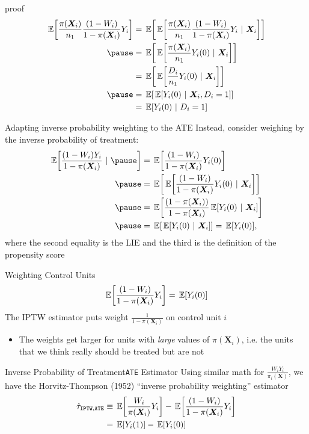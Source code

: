 \documentclass[aspectratio=169,t,11pt,table]{beamer}
\begin{document}
\begin{frame}{ proof}
  \begin{align*}
    \expec{\frac{\pi(\bm{X}_i)}{n_1} \frac{(1 - W_i)}{1 - \pi(\bm{X}_i)} Y_i}
    &= \expec{ \expec{ \frac{\pi(\bm{X}_i)}{n_1} \frac{(1 - W_i)}{1 - \pi(\bm{X}_i)} Y_i }{\bm{X}_i} } \\ \pause
    &= \expec{ \expec{\frac{\pi(\bm{X}_i)}{n_1} Y_i(0)}{\bm{X}_i} } \\
    &= \expec{ \expec{\frac{D_i}{n_1} Y_i(0)}{\bm{X}_i} } \\ \pause
    &= \expec{ \expec{Y_i(0)}{\bm{X}_i, D_i = 1} } \\
    &= \expec{Y_i(0)}{D_i = 1}
  \end{align*}
\end{frame}

\begin{frame}{Adapting inverse probability weighting to the ATE}
  Instead, consider weighing by the inverse probability of treatment:
  \begin{align*}
    \expec{\frac{(1 - W_i) Y_i}{1 - \pi(\bm{X}_i)}} \pause 
    &= \expec{\frac{(1 - W_i)}{1 - \pi(\bm{X}_i)} Y_i(0)} \\ \pause
    &= \expec{\expec{\frac{(1 - W_i) }{1 - \pi(\bm{X}_i)} Y_i(0)}{\bm{X}_i}} \\ \pause
    &= \expec{\frac{(1 - \pi(\bm{X}_i))}{1 - \pi(\bm{X}_i)} \expec{Y_i(0)}{\bm{X}_i}} \\ \pause
    &= \expec{\expec{Y_i(0)}{\bm{X}_i}} = \expec{Y_i(0)},
  \end{align*}
  where the second equality is the LIE and the third is the definition of the propensity score
\end{frame}

\begin{frame}{Weighting Control Units}
  \vspace*{-\bigskipamount}
  $$
    \expec{\frac{(1 - W_i)}{1 - \pi(\bm{X}_i)} Y_i} = \expec{Y_i(0)}
  $$
  The IPTW estimator puts weight $\frac{1}{1 - \pi(\bm{X}_i)}$ on control unit $i$
  \begin{itemize}
    \item The weights get larger for units with \emph{large} values of $\pi(\bm{X}_i)$, i.e. the units that we think really should be treated but are not
  \end{itemize}
\end{frame}

\begin{frame}{Inverse Probability of Treatment}{\texttt{ATE} Estimator}
  Using similar math for $\frac{W_i Y_i}{\pi_i(\bm{X})}$, we have the Horvitz-Thompson (1952) ``inverse probability weighting'' estimator
  \begin{align*}
    \hat{\tau}_{\texttt{IPTW},\texttt{ATE}} 
    &\equiv \expec{\frac{W_i}{\pi(\bm{X}_i)} Y_i} - \expec{\frac{(1 - W_i)}{1 - \pi(\bm{X}_i)} Y_i} \\
    &= \expec{Y_i(1)} - \expec{Y_i(0)}
  \end{align*}
\end{frame}
\end{document}
